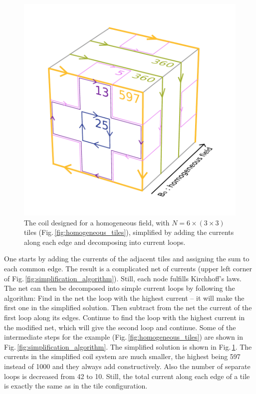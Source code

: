 \begin{figure}
  \centering
  \includegraphics[width=\linewidth]{gfx/coils/algorithm_simplified_5.pdf}
  \caption{The coil designed for a homogeneous field, with $N = 6 \times (3 \times 3)$ tiles (Fig.\,\ref{fig:homogeneous_tiles}), simplified by adding the currents along each edge and decomposing into current loops.}
  \label{fig:homogeneous_coils}
\end{figure}

One starts by adding the currents of the adjacent tiles and assigning the sum to each common edge. The result is a complicated net of currents (upper left corner of Fig.\,\ref{fig:simplification_algorithm}). Still, each node fulfills Kirchhoff's laws. The net can then be decomposed into simple current loops by following the algorithm: Find in the net the loop with the highest current -- it will make the first one in the simplified solution. Then subtract from the net the current of the first loop along its edges. Continue to find the loop with the highest current in the modified net, which will give the second loop and continue. Some of the intermediate steps for the example (Fig.\,\ref{fig:homogeneous_tiles}) are shown in Fig.\,\ref{fig:simplification_algorithm}. The simplified solution is shown in Fig.\,\ref{fig:homogeneous_coils}. The currents in the simplified coil system are much smaller, the highest being 597 instead of 1000 and they always add constructively. Also the number of separate loops is decreased from 42 to 10. Still, the total current along each edge of a tile is exactly the same as in the tile configuration.


